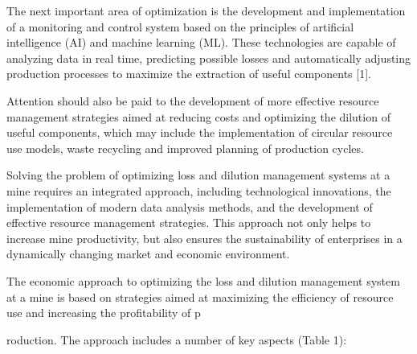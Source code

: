 \begin{multicols}{2}
The next important area of \hspace{0pt}\hspace{0pt}optimization is the
development and implementation of a monitoring and control system based
on the principles of artificial intelligence (AI) and machine learning
(ML). These technologies are capable of analyzing data in real time,
predicting possible losses and automatically adjusting production
processes to maximize the extraction of useful components {[}1{]}.

Attention should also be paid to the development of more effective
resource management strategies aimed at reducing costs and optimizing
the dilution of useful components, which may include the implementation
of circular resource use models, waste recycling and improved planning
of production cycles.

Solving the problem of optimizing loss and dilution management systems
at a mine requires an integrated approach, including technological
innovations, the implementation of modern data analysis methods, and the
development of effective resource management strategies. This approach
not only helps to increase mine productivity, but also ensures the
sustainability of enterprises in a dynamically changing market and
economic environment.

The economic approach to optimizing the loss and dilution management
system at a mine is based on strategies aimed at maximizing the
efficiency of resource use and increasing the profitability of
p\end{multicols}
roduction. The approach includes a number of key aspects (Table 1):

